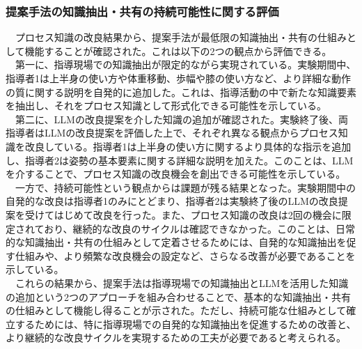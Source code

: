 \subsubsection{提案手法の知識抽出・共有の持続可能性に関する評価}
　プロセス知識の改良結果から、提案手法が最低限の知識抽出・共有の仕組みとして機能することが確認された。これは以下の2つの観点から評価できる。\\
　第一に、指導現場での知識抽出が限定的ながら実現されている。実験期間中、指導者1は上半身の使い方や体重移動、歩幅や膝の使い方など、より詳細な動作の質に関する説明を自発的に追加した。これは、指導活動の中で新たな知識要素を抽出し、それをプロセス知識として形式化できる可能性を示している。\\
　第二に、LLMの改良提案を介した知識の追加が確認された。実験終了後、両指導者はLLMの改良提案を評価した上で、それぞれ異なる観点からプロセス知識を改良している。指導者1は上半身の使い方に関するより具体的な指示を追加し、指導者2は姿勢の基本要素に関する詳細な説明を加えた。このことは、LLMを介することで、プロセス知識の改良機会を創出できる可能性を示している。\\
　一方で、持続可能性という観点からは課題が残る結果となった。実験期間中の自発的な改良は指導者1のみにとどまり、指導者2は実験終了後のLLMの改良提案を受けてはじめて改良を行った。また、プロセス知識の改良は2回の機会に限定されており、継続的な改良のサイクルは確認できなかった。このことは、日常的な知識抽出・共有の仕組みとして定着させるためには、自発的な知識抽出を促す仕組みや、より頻繁な改良機会の設定など、さらなる改善が必要であることを示している。\\
　これらの結果から、提案手法は指導現場での知識抽出とLLMを活用した知識の追加という2つのアプローチを組み合わせることで、基本的な知識抽出・共有の仕組みとして機能し得ることが示された。ただし、持続可能な仕組みとして確立するためには、特に指導現場での自発的な知識抽出を促進するための改善と、より継続的な改良サイクルを実現するための工夫が必要であると考えられる。\\

